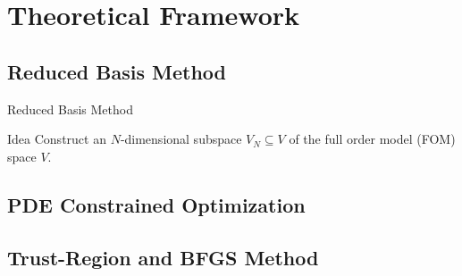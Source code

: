 \section{Theoretical Framework}

\subsection{Reduced Basis Method}

\begin{frame}{Reduced Basis Method}
    \begin{block}{Idea}
        Construct an $N$-dimensional subspace $V_N \subseteq V$ of the full order model (FOM) space $V$.
    \end{block}

\end{frame}

\subsection{PDE Constrained Optimization}


\subsection{Trust-Region and BFGS Method}

